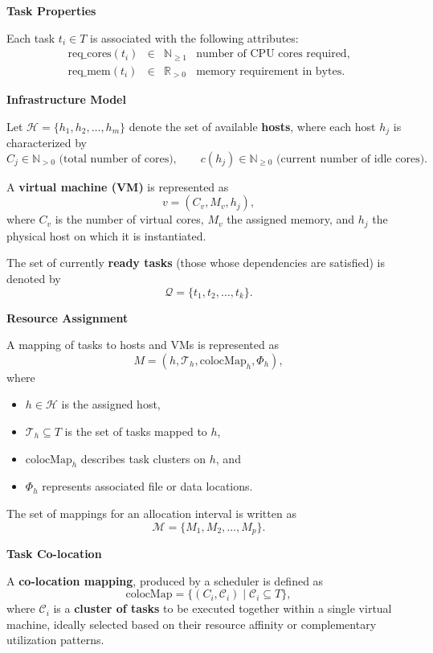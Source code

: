 \textbf{Task Properties}

Each task \( t_i \in T \) is associated with the following attributes:
\[
    \begin{array}{rcll}
        \text{req\_cores}(t_i) & \in & \mathbb{N}_{\ge 1} & \text{number of CPU cores required}, \\[4pt]
        \text{req\_mem}(t_i)   & \in & \mathbb{R}_{>0}    & \text{memory requirement in bytes.}
    \end{array}
\]

\textbf{Infrastructure Model}

Let \( \mathcal{H} = \{h_1, h_2, \dots, h_m\} \) denote the set of available \textbf{hosts},
where each host \( h_j \) is characterized by
\[
    C_j \in \mathbb{N}_{>0} \text{ (total number of cores)}, \qquad
    c(h_j) \in \mathbb{N}_{\ge 0} \text{ (current number of idle cores).}
\]

A \textbf{virtual machine (VM)} is represented as
\[
    v = (C_v, M_v, h_j),
\]
where \( C_v \) is the number of virtual cores, \( M_v \) the assigned memory,
and \( h_j \) the physical host on which it is instantiated.

The set of currently \textbf{ready tasks} (those whose dependencies are satisfied) is denoted by
\[
    \mathcal{Q} = \{t_1, t_2, \dots, t_k\}.
\]

\textbf{Resource Assignment}

A mapping of tasks to hosts and VMs is represented as
\[
    M = (h, \mathcal{T}_h, \text{colocMap}_h, \Phi_h),
\]
where
\begin{itemize}
    \item $h \in \mathcal{H}$ is the assigned host,
    \item $\mathcal{T}_h \subseteq T$ is the set of tasks mapped to $h$,
    \item $\text{colocMap}_h$ describes task clusters on $h$, and
    \item $\Phi_h$ represents associated file or data locations.
\end{itemize}
The set of mappings for an allocation interval is written as
\[
    \mathcal{M} = \{ M_1, M_2, \dots, M_p \}.
\]

\textbf{Task Co-location}

A \textbf{co-location mapping}, produced by a scheduler is defined as
\[
    \text{colocMap} = \{ (C_i, \mathcal{C}_i) \mid \mathcal{C}_i \subseteq T \},
\]
where $\mathcal{C}_i$ is a \textbf{cluster of tasks} to be executed together within a single virtual machine, ideally selected based on their resource affinity or complementary utilization patterns.

